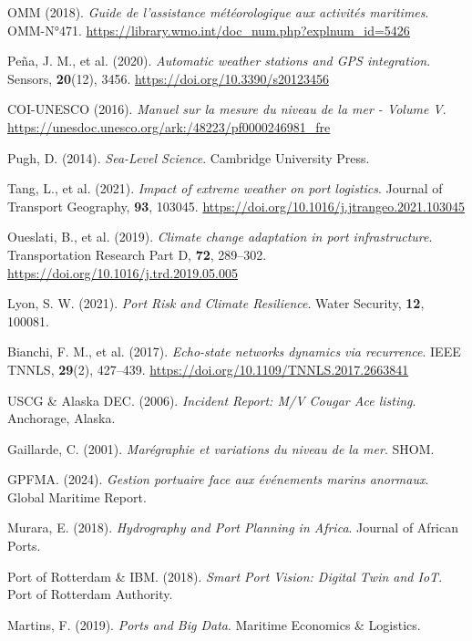 \documentclass[a4paper,12pt,openany]{report}
\begin{document}
\begin{thebibliography}{99}
	OMM (2018).
	\textit{Guide de l’assistance météorologique aux activités maritimes}.
	OMM-N°471. \url{https://library.wmo.int/doc_num.php?explnum_id=5426}
	
	Peña, J. M., et al. (2020).
	\textit{Automatic weather stations and GPS integration}.
	Sensors, \textbf{20}(12), 3456. \url{https://doi.org/10.3390/s20123456}
	
	COI-UNESCO (2016).
	\textit{Manuel sur la mesure du niveau de la mer - Volume V}.
	\url{https://unesdoc.unesco.org/ark:/48223/pf0000246981_fre}
	
	Pugh, D. (2014).
	\textit{Sea-Level Science}.
	Cambridge University Press.
	
	Tang, L., et al. (2021).
	\textit{Impact of extreme weather on port logistics}.
	Journal of Transport Geography, \textbf{93}, 103045. \url{https://doi.org/10.1016/j.jtrangeo.2021.103045}
	
	Oueslati, B., et al. (2019).
	\textit{Climate change adaptation in port infrastructure}.
	Transportation Research Part D, \textbf{72}, 289–302. \url{https://doi.org/10.1016/j.trd.2019.05.005}
	
	Lyon, S. W. (2021).
	\textit{Port Risk and Climate Resilience}.
	Water Security, \textbf{12}, 100081.
	
	Bianchi, F. M., et al. (2017).
	\textit{Echo-state networks dynamics via recurrence}.
	IEEE TNNLS, \textbf{29}(2), 427–439. \url{https://doi.org/10.1109/TNNLS.2017.2663841}
	
	USCG \& Alaska DEC. (2006).
	\textit{Incident Report: M/V Cougar Ace listing}.
	Anchorage, Alaska.
	
	Gaillarde, C. (2001).
	\textit{Marégraphie et variations du niveau de la mer}.
	SHOM.
	
	GPFMA. (2024).
	\textit{Gestion portuaire face aux événements marins anormaux}.
	Global Maritime Report.
	
	Murara, E. (2018).
	\textit{Hydrography and Port Planning in Africa}.
	Journal of African Ports.
	
	Port of Rotterdam \& IBM. (2018).
	\textit{Smart Port Vision: Digital Twin and IoT}.
	Port of Rotterdam Authority.
	
	Martins, F. (2019).
	\textit{Ports and Big Data}.
	Maritime Economics \& Logistics.
	

\end{thebibliography}
\end{document}
